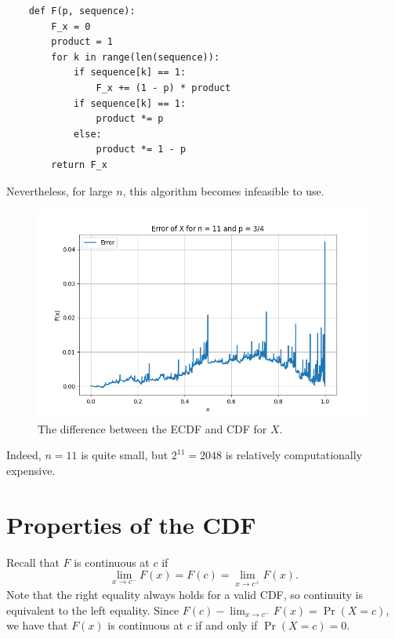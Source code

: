 \documentclass{article}
\begin{document}
\begin{verbatim}
    def F(p, sequence):
        F_x = 0
        product = 1
        for k in range(len(sequence)):
            if sequence[k] == 1:
                F_x += (1 - p) * product
            if sequence[k] == 1:
                product *= p
            else: 
                product *= 1 - p
        return F_x
\end{verbatim}

Nevertheless, for large \(n\), this algorithm becomes infeasible to use.

\begin{figure}
    \centering
    \includegraphics[width=1.0\linewidth]{images/error.png}
    \caption{The difference between the ECDF and CDF for \(X\).}
\end{figure}

Indeed, \(n = 11\) is quite small, but \(2^{11} = 2048\) is relatively computationally expensive.


\section{Properties of the CDF}

Recall that \(F\) is continuous at \(c\) if
\[ \lim_{x \to c^-} F(x) = F(c) = \lim_{x \to c^+} F(x). \]
Note that the right equality always holds for a valid CDF, so continuity is equivalent to the left equality. Since \(F(c) - \lim_{x \to c^-} F(x) = \Pr(X = c)\), we have that \(F(x)\) is continuous at \(c\) if and only if \(\Pr(X = c) = 0\).
\end{document}
